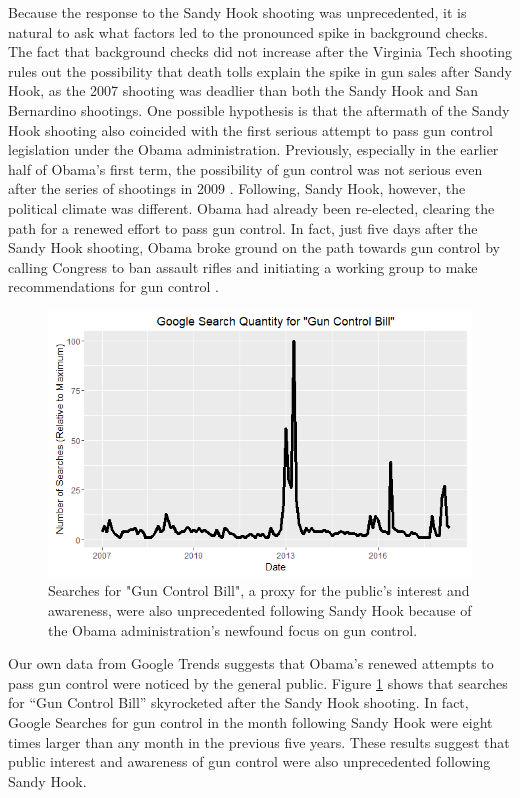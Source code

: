 \documentclass[9pt,twocolumn,twoside,lineno]{pnas-new}
\begin{document}
Because the response to the Sandy Hook shooting was unprecedented, it is natural to ask what factors led to the pronounced spike in background checks. The fact that background checks did not increase after the Virginia Tech shooting rules out the possibility that death tolls explain the spike in gun sales after Sandy Hook, as the 2007 shooting was deadlier than both the Sandy Hook and San Bernardino shootings. One possible hypothesis is that the aftermath of the Sandy Hook shooting also coincided with the first serious attempt to pass gun control legislation under the Obama administration. Previously, especially in the earlier half of Obama’s first term, the possibility of gun control was not serious even after the series of shootings in 2009 \cite{rucker_gun_2012}. Following, Sandy Hook, however, the political climate was different. Obama had already been re-elected, clearing the path for a renewed effort to pass gun control. In fact, just five days after the Sandy Hook shooting, Obama broke ground on the path towards gun control by calling Congress to ban assault rifles and initiating a working group to make recommendations for gun control \cite{rucker_gun_2012}. 
\begin{figure}
  \centering
  \includegraphics[width=\linewidth]{figures/google-trends-gun-control}
  \caption{Searches for "Gun Control Bill", a proxy for the public's interest and awareness, were also unprecedented following Sandy Hook because of the Obama administration's newfound focus on gun control.}
  \label{fig:gtrends}
\end{figure}
	Our own data from Google Trends suggests that Obama’s renewed attempts to pass gun control were noticed by the general public. Figure \ref{fig:gtrends} shows that searches for “Gun Control Bill” skyrocketed after the Sandy Hook shooting. In fact, Google Searches for gun control in the month following Sandy Hook were eight times larger than any month in the previous five years. These results suggest that public interest and awareness of gun control were also unprecedented following Sandy Hook. 
    
\end{document}
